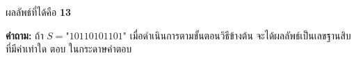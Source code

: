 ผลลัพธ์ที่ได้คือ \textbf{13}

\textbf{คำถาม:} ถ้า $S = \text{"10110101101"}$ เมื่อดำเนินการตามขั้นตอนวิธีข้างต้น จะได้ผลลัพธ์เป็นเลขฐานสิบที่มีค่าเท่าใด
\newline\newline
ตอบ ในกระดาษคำตอบ \newline
